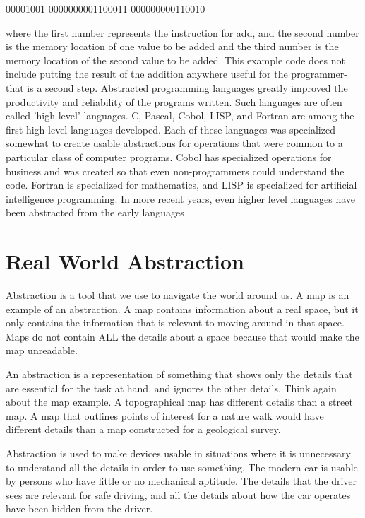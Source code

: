 00001001 0000000001100011 000000000110010

where the first number represents the instruction for add, and the second number is the memory location of one value to be added and the third number is the memory location of the second value to be added. This example code does not include putting the result of the addition anywhere useful for the programmer- that is a second step.
Abstracted programming languages greatly improved the productivity and reliability of the programs written. Such languages are often called 'high level' languages. C, Pascal, Cobol, LISP, and Fortran are among the first high level languages developed. Each of these languages was specialized somewhat to create usable abstractions for operations that were common to a particular class of computer programs. Cobol has specialized operations for business and was created so that even non-programmers could understand the code. Fortran is specialized for mathematics, and LISP is specialized for artificial intelligence programming.
In more recent years, even higher level languages have been abstracted from the early languages



\section{Real World Abstraction}
Abstraction is a tool that we use to navigate the world around us. A map is an example of an abstraction. A map contains information about a real space, but it only contains the information that is relevant to moving around in that space. Maps do not contain ALL the details about a space because that would make the map unreadable.

An abstraction is a representation of something that shows only the details that are essential for the task at hand, and ignores the other details. Think again about the map example. A topographical map has different details than a street map. A map that outlines points of interest for a nature walk would have different details than a map constructed for a geological survey.

Abstraction is used to make devices usable in situations where it is unnecessary to understand all the details in order to use something. The modern car is usable by persons who have little or no mechanical aptitude. The details that the driver sees are relevant for safe driving, and all the details about how the car operates have been hidden from the driver.

